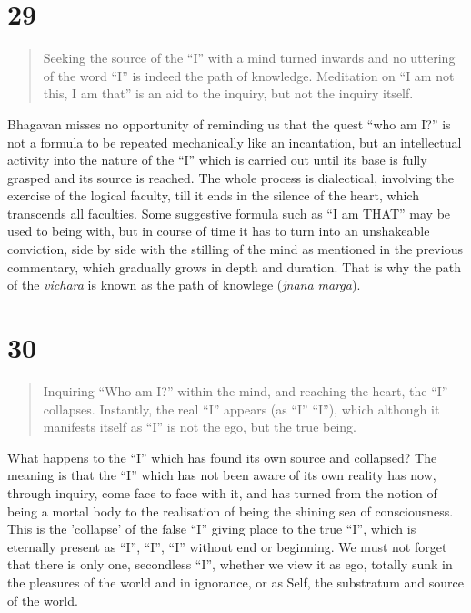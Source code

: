 \documentclass[12pt]{report}
\begin{document}
\index{}

\section{29}

\begin{quote}
  Seeking the source of the ``I'' with a mind turned inwards and no
  uttering of the word ``I'' is indeed the path of
  knowledge. Meditation on ``I am not this, I am that'' is an aid to
  the inquiry, but not the inquiry itself.
\end{quote}


Bhagavan misses no opportunity of reminding us that the quest ``who am
I?'' is not a formula to be repeated mechanically like an incantation,
but an intellectual activity into the nature of the ``I'' which is
carried out until its base is fully grasped and its source is
reached. The whole process is dialectical, involving the exercise of
the logical faculty, till it ends in the silence of the heart, which
transcends all faculties. Some suggestive formula such as ``I am
THAT'' may be used to being with, but in course of time it has to turn
into an unshakeable conviction, side by side with the stilling of the
mind as mentioned in the previous commentary, which gradually grows in
depth and duration. That is why the path of the \emph{vichara} is
known as the path of knowlege (\emph{jnana marga}).

\section{30}

\begin{quote}
  Inquiring ``Who am I?'' within the mind, and reaching the heart, the
  ``I'' collapses. Instantly, the real ``I'' appears (as ``I'' ``I''),
  which although it manifests itself as ``I'' is not the ego, but the
  true being.
\end{quote}


What happens to the ``I'' which has found its own source and
collapsed? The meaning is that the ``I'' which has not been aware of
its own reality has now, through inquiry, come face to face with it,
and has turned from the notion of being a mortal body to the
realisation of being the shining sea of consciousness. This is the
'collapse' of the false ``I'' giving place to the true ``I'', which is
eternally present as ``I'', ``I'', ``I'' without end or beginning. We
must not forget that there is only one, secondless ``I'', whether we
view it as ego, totally sunk in the pleasures of the world and in
ignorance, or as Self, the substratum and source of the world.
\end{document}
